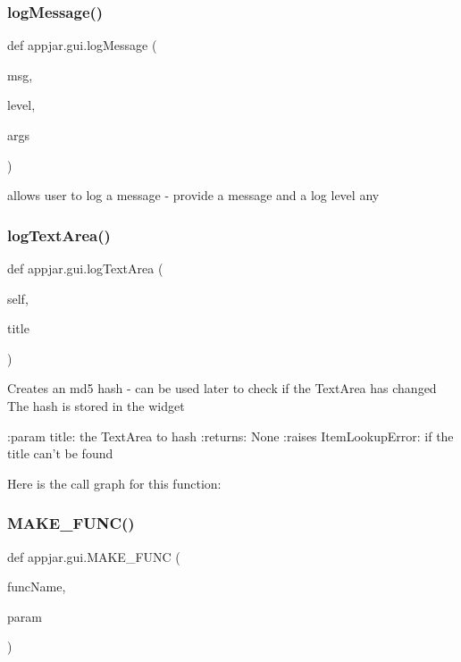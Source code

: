 \subsubsection{\texorpdfstring{log\+Message()}{logMessage()}}
{\footnotesize\ttfamily def appjar.\+gui.\+log\+Message (\begin{DoxyParamCaption}\item[{}]{msg,  }\item[{}]{level,  }\item[{}]{args }\end{DoxyParamCaption})\hspace{0.3cm}{\ttfamily [static]}}

\begin{DoxyVerb}allows user to log a message - provide a message and a log level
    any %
 \mbox{\label{classappjar_1_1gui_a859cc86dc9ffbf5dbb44fb3d23082da7}} 
\subsubsection{\texorpdfstring{log\+Text\+Area()}{logTextArea()}}
{\footnotesize\ttfamily def appjar.\+gui.\+log\+Text\+Area (\begin{DoxyParamCaption}\item[{}]{self,  }\item[{}]{title }\end{DoxyParamCaption})}

\begin{DoxyVerb}Creates an md5 hash - can be used later to check if the TextArea has changed
The hash is stored in the widget

:param title: the TextArea to hash
:returns: None
:raises ItemLookupError: if the title can't be found
\end{DoxyVerb}
 Here is the call graph for this function\+:
\mbox{\label{classappjar_1_1gui_a42aaf376a6c07c842b1b498948a9691a}} 
\subsubsection{\texorpdfstring{M\+A\+K\+E\+\_\+\+F\+U\+N\+C()}{MAKE\_FUNC()}}
{\footnotesize\ttfamily def appjar.\+gui.\+M\+A\+K\+E\+\_\+\+F\+U\+NC (\begin{DoxyParamCaption}\item[{}]{func\+Name,  }\item[{}]{param }\end{DoxyParamCaption})\hspace{0.3cm}{\ttfamily [static]}}




\end{DoxyVerb}
